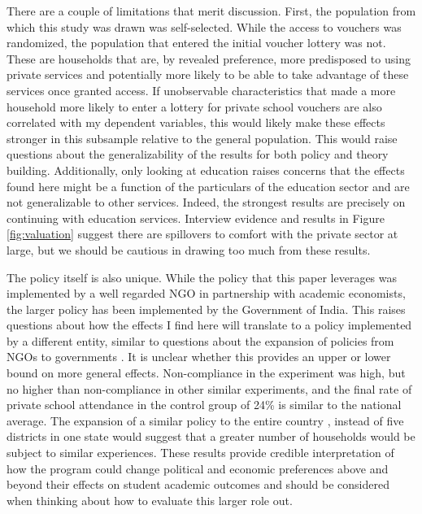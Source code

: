 \documentclass[hidelinks, 12pt, titlepage]{article}
\begin{document}
	There are a couple of limitations that merit discussion.  First, the population from which this study was drawn was self-selected.  While the access to vouchers was randomized, the population that entered the initial voucher lottery was not.  These are households that are, by revealed preference, more predisposed to using private services and potentially more likely to be able to take advantage of these services once granted access.  If unobservable characteristics that made a more household more likely to enter a lottery for private school vouchers are also correlated with my dependent variables, this would likely make these effects stronger in this subsample relative to the general population. This would raise questions about the generalizability of the results for both policy and theory building. Additionally, only looking at education raises concerns that the effects found here might be a function of the particulars of the education sector and are not generalizable to other services.  Indeed, the strongest results are precisely on continuing with education services.  Interview evidence and results in Figure \ref{fig:valuation} suggest there are spillovers to comfort with the private sector at large, but we should be cautious in drawing too much from these results.
	
	The policy itself is also unique.  While the policy that this paper leverages was implemented by a well regarded NGO in partnership with academic economists, the larger policy has been implemented by the Government of India.  This raises questions about how the effects I find here will translate to a policy implemented by a different entity, similar to questions about the expansion of policies from NGOs to governments \citep{Banerjee2017a}.  It is unclear whether this provides an upper or lower bound on more general effects.  Non-compliance in the experiment was high, but no higher than non-compliance in other similar experiments, and the final rate of private school attendance in the control group of 24\% is similar to the national average. The expansion of a similar policy to the entire country \citep{Government2009}, instead of five districts in one state would suggest that a greater number of households would be subject to similar experiences. These results provide credible interpretation of how the program could change political and economic preferences above and beyond their effects on student academic outcomes and should be considered when thinking about how to evaluate this larger role out.
\end{document}
